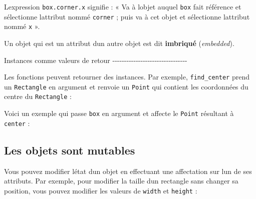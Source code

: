 L\textquotesingle expression \texttt{box.corner.x} signifie : « Va à
l\textquotesingle objet auquel \texttt{box} fait référence et
sélectionne l\textquotesingle attribut nommé \texttt{corner} ; puis va à
cet objet et sélectionne l\textquotesingle attribut nommé \texttt{x} ».

Un objet qui est un attribut d\textquotesingle un autre objet est dit
\textbf{imbriqué} (\emph{embedded}).

Instances comme valeurs de retour
-\/-\/-\/-\/-\/-\/-\/-\/-\/-\/-\/-\/-\/-\/-\/-\/-\/-\/-\/-\/-\/-\/-\/-\/-\/-\/-\/-\/-\/-\/-\/-

Les fonctions peuvent retourner des instances. Par exemple,
\texttt{find\_center} prend un \texttt{Rectangle} en argument et renvoie
un \texttt{Point} qui contient les coordonnées du centre du
\texttt{Rectangle} :

\begin{Shaded}
\begin{Highlighting}[]
\OperatorTok{=}
\OperatorTok{=}\OperatorTok{+}\OperatorTok{/}
\OperatorTok{=}\OperatorTok{+}\OperatorTok{/}
\end{Highlighting}
\end{Shaded}

Voici un exemple qui passe \texttt{box} en argument et affecte le
\texttt{Point} résultant à \texttt{center} :

\begin{Shaded}
\begin{Highlighting}[]
\OperatorTok{\textgreater{}\textgreater{}\textgreater{}}\OperatorTok{=}
\OperatorTok{\textgreater{}\textgreater{}\textgreater{}}
\NormalTok{(}\NormalTok{, }\NormalTok{)}
\end{Highlighting}
\end{Shaded}

\hypertarget{les-objets-sont-mutables}{%
\subsection{Les objets sont mutables}\label{les-objets-sont-mutables}}

Vous pouvez modifier l\textquotesingle état d\textquotesingle un objet
en effectuant une affectation sur l\textquotesingle un de ses attributs.
Par exemple, pour modifier la taille d\textquotesingle un rectangle sans
changer sa position, vous pouvez modifier les valeurs de \texttt{width}
et \texttt{height} :

